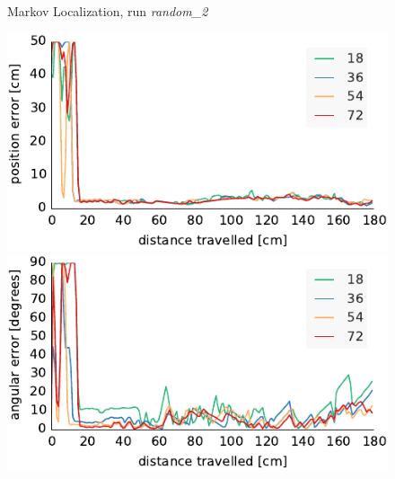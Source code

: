 \documentclass[letterpaper, 10pt, conference]{ieeeconf}
\begin{document}
\begin{figure}
\vspace{.5em}

\begin{center}
Markov Localization, run \emph{random\_2}
\end{center}
\includegraphics{ml-whole_random_2-xy}\hfill
\includegraphics{ml-whole_random_2-theta}

\vspace{.5em}


\end{figure}
\end{document}
